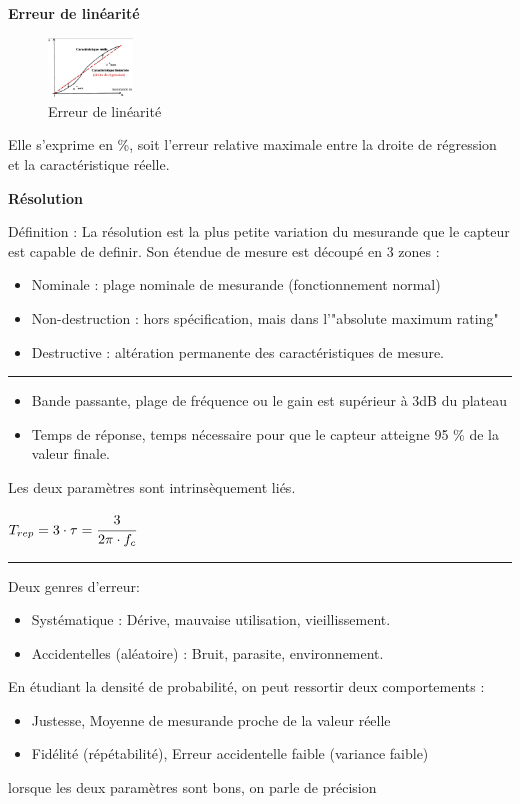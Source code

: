 \documentclass[	DIV=calc,%
							paper=a4,%
							fontsize=11pt,%
							twocolumn]{scrartcl} %
\newcommand{\hformbar}[1]{\bigskip\hrule\vspace{5pt}} %
\newcounter{mycounter}
\newcommand{\formdesc}[1]{\noindent\textbf{#1} \addtocounter{mycounter}{1} \hfill \themycounter}
\begin{document}
\formdesc{Erreur de linéarité}
\begin{figure}[H]
    \begin{center}
        \includegraphics[width=0.2\textwidth]{img/linearite.JPG}
        \caption{Erreur de linéarité}
        \label{fig:Erreur de linéarité}
    \end{center}
\end{figure}
Elle s'exprime en \%, soit l'erreur relative maximale entre la droite de régression et la caractéristique réelle.

\formdesc{Résolution}

Définition : La résolution est la plus petite variation du mesurande que le capteur est capable de definir.
Son étendue de mesure est découpé en 3 zones : 
\begin{itemize}
    \item Nominale : plage nominale de mesurande (fonctionnement normal)
    \item Non-destruction : hors spécification, mais dans l'"absolute maximum rating"
    \item Destructive : altération permanente des caractéristiques de mesure.
\end{itemize}

\hformbar

\formdesc{Rapidité d'un capteur}

\begin{itemize}
    \item Bande passante, plage de fréquence ou le gain est supérieur à 3dB du plateau
    \item Temps de réponse, temps nécessaire pour que le capteur atteigne 95 \% de la valeur finale.
\end{itemize}
Les deux paramètres sont intrinsèquement liés. 

{\hfill $T_{rep} = 3 \cdot \tau = \cfrac{3}{2\pi \cdot f_c}$ \hfill}

\hformbar

\formdesc{Erreur de mesure}

Deux genres d'erreur:
\begin{itemize}
    \item Systématique : Dérive, mauvaise utilisation, vieillissement.
    \item Accidentelles (aléatoire) : Bruit, parasite, environnement.
\end{itemize}
En étudiant la densité de probabilité, on peut ressortir deux comportements : 
\begin{itemize}
    \item Justesse, Moyenne de mesurande proche de la valeur réelle
    \item Fidélité (répétabilité), Erreur accidentelle faible (variance faible)
\end{itemize}
lorsque les deux paramètres sont bons, on parle de précision
\end{document}
